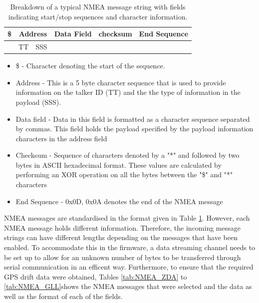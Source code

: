 \begin{table}[H]
	\centering
	\caption{ Breakdown of a typical NMEA message string with fields indicating start/stop sequences and character information.}
	\begin{tabular}{|c|c|c|c|c|c|}
		\hline
		\$    & \multicolumn{2}{|c|}{Address} & Data Field & checksum & End Sequence\\
		\hline
		\multicolumn{1}{c|}{} & TT & SSS &\multicolumn{3}{c}{} \\
		\cline{2-3}
	\end{tabular}
	\label{tab:GPS_data_format}
\end{table}
\begin{itemize}
	\item \$ - Character denoting the start of the sequence.
	\item Address - This is a 5 byte character sequence that is used to provide information on the talker ID (TT) and the the type of information in the payload (SSS).
	\item Data field - Data in this field is formatted as a character sequence separated by commas. This field holds the payload specified by the payload information characters in the address field
	\item  Checksum - Sequence of characters denoted by a "*" and followed by two bytes in ASCII hexadecimal format. These values are calculated by performing an XOR operation on all the bytes between the "\$" and "*" characters
	\item End Sequence - 0x0D, 0x0A denotes the end of the  NMEA message
\end{itemize}

NMEA messages are standardised in the format given in Table \ref{tab:GPS_data_format}. However, each NMEA message holds different information. Therefore, the incoming message strings can have different lengths depending on the messages that have been enabled. To accommodate this in the firmware, a data streaming channel needs to be set up to allow for an unknown number of bytes to be transferred through serial communication in an efficent way. Furthermore, to ensure that the required GPS drift data were obtained, Tables \ref{tab:NMEA_ZDA} to \ref{tab:NMEA_GLL}shows the NMEA messages that were selected and the data as well as the format of each of the fields.

